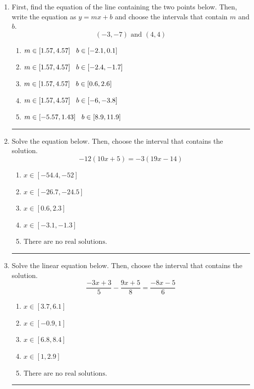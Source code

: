 \documentclass[14pt]{extbook}
\newcommand{\litem}[1]{\item#1\hspace*{-1cm}\rule{\textwidth}{0.4pt}}
\begin{document}
\begin{enumerate}
{\begin{enumerate}[label=\Alph*.]
\end{enumerate} }
\litem{
First, find the equation of the line containing the two points below. Then, write the equation as $ y=mx+b $ and choose the intervals that contain $m$ and $b$.\[ (-3, -7) \text{ and } (4, 4) \]\begin{enumerate}[label=\Alph*.]
\item \( m \in [1.57, 4.57] \hspace*{3mm} b \in [-2.1, 0.1] \)
\item \( m \in [1.57, 4.57] \hspace*{3mm} b \in [-2.4, -1.7] \)
\item \( m \in [1.57, 4.57] \hspace*{3mm} b \in [0.6, 2.6] \)
\item \( m \in [1.57, 4.57] \hspace*{3mm} b \in [-6, -3.8] \)
\item \( m \in [-5.57, 1.43] \hspace*{3mm} b \in [8.9, 11.9] \)

\end{enumerate} }

\litem{
Solve the equation below. Then, choose the interval that contains the solution.\[ -12(10x + 5) = -3(19x -14) \]\begin{enumerate}[label=\Alph*.]
\item \( x \in [-54.4, -52] \)
\item \( x \in [-26.7, -24.5] \)
\item \( x \in [0.6, 2.3] \)
\item \( x \in [-3.1, -1.3] \)
\item \( \text{There are no real solutions.} \)

\end{enumerate} }

\litem{
Solve the linear equation below. Then, choose the interval that contains the solution.\[ \frac{-3x + 3}{5} - \frac{9x + 5}{8} = \frac{-8x -5}{6} \]\begin{enumerate}[label=\Alph*.]
\item \( x \in [3.7, 6.1] \)
\item \( x \in [-0.9, 1] \)
\item \( x \in [6.8, 8.4] \)
\item \( x \in [1, 2.9] \)
\item \( \text{There are no real solutions.} \)

\end{enumerate} }
\end{enumerate}
\end{document}
